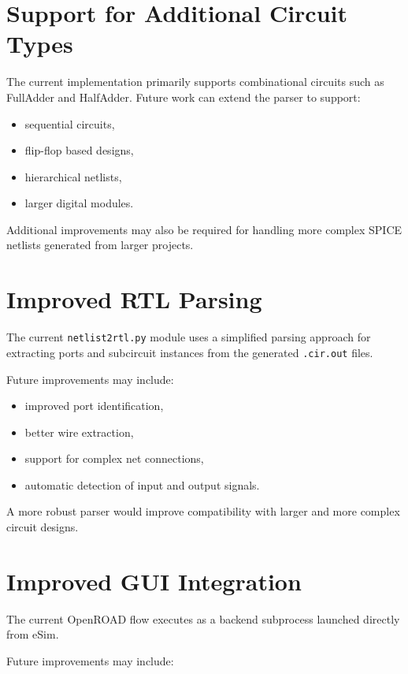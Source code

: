 \section{Support for Additional Circuit Types}

The current implementation primarily supports combinational circuits such as FullAdder and HalfAdder. Future work can extend the parser to support:

\begin{itemize}
    \item sequential circuits,
    \item flip-flop based designs,
    \item hierarchical netlists,
    \item larger digital modules.
\end{itemize}

Additional improvements may also be required for handling more complex SPICE netlists generated from larger projects.

\section{Improved RTL Parsing}

The current \texttt{netlist2rtl.py} module uses a simplified parsing approach for extracting ports and subcircuit instances from the generated \texttt{.cir.out} files.

Future improvements may include:

\begin{itemize}
    \item improved port identification,
    \item better wire extraction,
    \item support for complex net connections,
    \item automatic detection of input and output signals.
\end{itemize}

A more robust parser would improve compatibility with larger and more complex circuit designs.

\section{Improved GUI Integration}

The current OpenROAD flow executes as a backend subprocess launched directly from eSim.

Future improvements may include:

